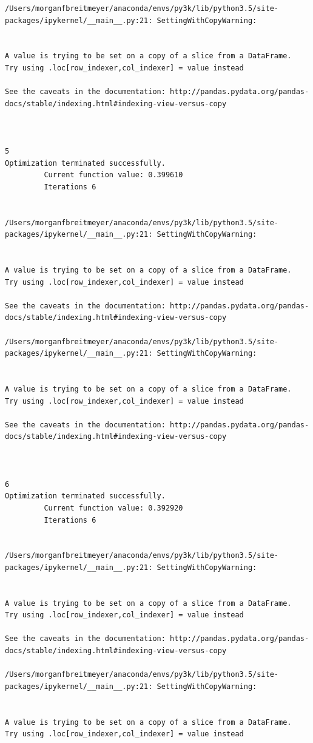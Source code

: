 \begin{lstlisting}
/Users/morganfbreitmeyer/anaconda/envs/py3k/lib/python3.5/site-packages/ipykernel/__main__.py:21: SettingWithCopyWarning:


A value is trying to be set on a copy of a slice from a DataFrame.
Try using .loc[row_indexer,col_indexer] = value instead

See the caveats in the documentation: http://pandas.pydata.org/pandas-docs/stable/indexing.html#indexing-view-versus-copy



5
Optimization terminated successfully.
         Current function value: 0.399610
         Iterations 6


/Users/morganfbreitmeyer/anaconda/envs/py3k/lib/python3.5/site-packages/ipykernel/__main__.py:21: SettingWithCopyWarning:


A value is trying to be set on a copy of a slice from a DataFrame.
Try using .loc[row_indexer,col_indexer] = value instead

See the caveats in the documentation: http://pandas.pydata.org/pandas-docs/stable/indexing.html#indexing-view-versus-copy

/Users/morganfbreitmeyer/anaconda/envs/py3k/lib/python3.5/site-packages/ipykernel/__main__.py:21: SettingWithCopyWarning:


A value is trying to be set on a copy of a slice from a DataFrame.
Try using .loc[row_indexer,col_indexer] = value instead

See the caveats in the documentation: http://pandas.pydata.org/pandas-docs/stable/indexing.html#indexing-view-versus-copy



6
Optimization terminated successfully.
         Current function value: 0.392920
         Iterations 6


/Users/morganfbreitmeyer/anaconda/envs/py3k/lib/python3.5/site-packages/ipykernel/__main__.py:21: SettingWithCopyWarning:


A value is trying to be set on a copy of a slice from a DataFrame.
Try using .loc[row_indexer,col_indexer] = value instead

See the caveats in the documentation: http://pandas.pydata.org/pandas-docs/stable/indexing.html#indexing-view-versus-copy

/Users/morganfbreitmeyer/anaconda/envs/py3k/lib/python3.5/site-packages/ipykernel/__main__.py:21: SettingWithCopyWarning:


A value is trying to be set on a copy of a slice from a DataFrame.
Try using .loc[row_indexer,col_indexer] = value instead


\end{lstlisting}
